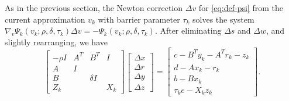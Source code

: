 \documentclass{amsart}
\begin{document}
As in the previous section,
the Newton correction $\Delta v$ for \eqref{eq:def-psi} from the current
approximation $v_k$ with barrier parameter $\tau_k$ solves the system
$\nabla_v \Psi_k(v_k; \rho, \delta, \tau_k) \Delta v = -\Psi_k(v_k; \rho,
\delta, \tau_k)$.
After eliminating $\Delta s$ and $\Delta w$,
and slightly rearranging, we have
\begin{equation}
  \label{eq:newton-unsym}
  \begin{bmatrix}
    -\rho I & A^T & B^T      & I \\
     A      & I   &          &   \\
     B      &     & \delta I &   \\
     Z_k    &          &     & X_k
  \end{bmatrix}
  \begin{bmatrix}
    \Delta x \\ \Delta r \\ \Delta y \\ \Delta z
  \end{bmatrix}
  =
  \begin{bmatrix}
    c - B^T y_k - A^T r_k - z_k \\
    d - A x_k - r_k \\
    b - B x_k \\
    \tau_k e - X_k z_k
  \end{bmatrix}.
\end{equation}
\end{document}

